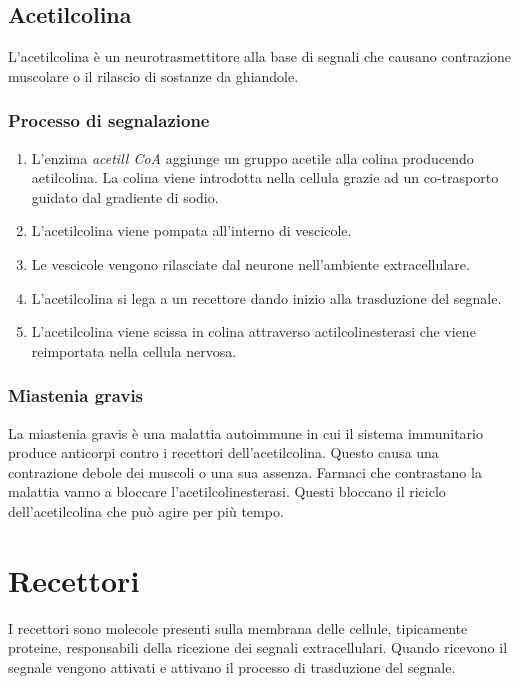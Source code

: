 	\subsection{Acetilcolina}
	L'acetilcolina \`e un neurotrasmettitore alla base di segnali che causano contrazione muscolare o il rilascio di sostanze da ghiandole.

		\subsubsection{Processo di segnalazione}
		\begin{multicols}{2}
			\begin{enumerate}
				\item L'enzima \emph{acetill CoA} aggiunge un gruppo acetile alla colina producendo aetilcolina.
					La colina viene introdotta nella cellula grazie ad un co-trasporto guidato dal gradiente di sodio.
				\item L'acetilcolina viene pompata all'interno di vescicole.
				\item Le vescicole vengono rilasciate dal neurone nell'ambiente extracellulare.
				\item L'acetilcolina si lega a un recettore dando inizio alla trasduzione del segnale.
				\item L'acetilcolina viene scissa in colina attraverso actilcolinesterasi che viene reimportata nella cellula nervosa.
			\end{enumerate}
		\end{multicols}

		\subsubsection{Miastenia gravis}
		La miastenia gravis \`e una malattia autoimmune in cui il sistema immunitario produce anticorpi contro i recettori dell'acetilcolina.
		Questo causa una contrazione debole dei muscoli o una sua assenza.
		Farmaci che contrastano la malattia vanno a bloccare l'acetilcolinesterasi.
		Questi bloccano il riciclo dell'acetilcolina che pu\`o agire per pi\`u tempo.

\section{Recettori}
I  recettori sono molecole presenti sulla membrana delle cellule, tipicamente proteine, responsabili della ricezione dei segnali extracellulari.
Quando ricevono il segnale vengono attivati e attivano il processo di trasduzione del segnale.

